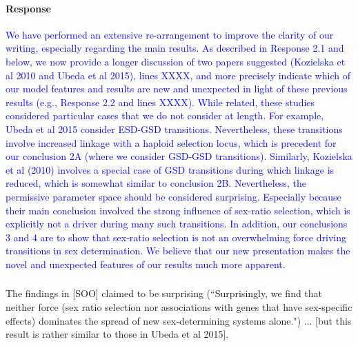 \documentclass[10pt,letterpaper]{article}
\begin{document}
\noindent\paragraph{Response}
\textcolor{blue}{We have performed an extensive re-arrangement to improve the clarity of our writing, especially regarding the main results. 
As described in Response 2.1 and below, we now provide a longer discussion of two papers suggested (Kozielska et al 2010 and Ubeda et al 2015), lines XXXX, and more precisely indicate which of our model features and results are new and unexpected in light of these previous results (e.g., Response 2.2 and lines XXXX).
While related, these studies considered particular cases that we do not consider at length. For example, Ubeda et al 2015 consider ESD-GSD transitions. Nevertheless, these transitions involve increased linkage with a haploid selection locus, which is precedent for our conclusion 2A (where we consider GSD-GSD transitions). 
Similarly, Kozielska et al (2010) involves a special case of GSD transitions during which linkage is reduced, which is somewhat similar to conclusion 2B. Nevertheless, the permissive parameter space should be considered surprising. Especially because their main conclusion involved the strong influence of sex-ratio selection, which is explicitly not a driver during many such transitions. In addition, our conclusions 3 and 4 are to show that sex-ratio selection is not an overwhelming force driving transitions in sex determination. 
We believe that our new presentation makes the novel and unexpected features of our results much more apparent. 
}

\noindent\subsubsection{}
The findings in [SOO] claimed to be surprising (``Surprisingly, we find that neither force (sex ratio selection nor associations with genes that have sex-specific effects) dominates the spread of new sex-determining systems alone.") ... [but this result is rather similar to those in Ubeda et al 2015]. 
\end{document}
